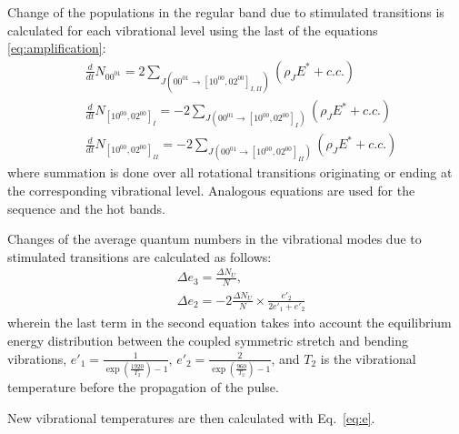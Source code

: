 \documentclass{report}
\begin{document}
Change of the populations in the regular band due to stimulated transitions is calculated for each vibrational level using the last of the equations \ref{eq:amplification}:
\begin{equation}\label{eq:dNdt}
\begin{aligned}
&\frac{d}{dt}N_{00^01} = 2\sum\limits_{J(00^01\rightarrow[10^00,02^00]_{I,II})} (\rho _J E^* + c.c.)\\
&\frac{d}{dt}N_{[10^00,02^00]_I} =  -2\sum\limits_{J(00^01\rightarrow[10^00,02^00]_I)} (\rho _J E^* + c.c.)\\
&\frac{d}{dt}N_{[10^00,02^00]_{II}} =  -2\sum\limits_{J(00^01\rightarrow[10^00,02^00]_{II})} (\rho _J E^* + c.c.)
\end{aligned}
\end{equation}
where summation is done over all rotational transitions originating or ending at the corresponding vibrational level. Analogous equations are used for the sequence and the hot bands.

Changes of the average quantum numbers in the vibrational modes due to stimulated transitions are calculated as follows:
\begin{equation}\label{eq:Deltae}
\begin{aligned}
&\Delta e_3 = \frac{\Delta N_U}{N},\\
&\Delta e_2 = -2\frac{\Delta N_U}{N} \times \frac{e'_2}{2e'_1+e'_2}
\end{aligned}
\end{equation}
wherein the last term in the second equation takes into account the equilibrium energy distribution between the coupled symmetric stretch and bending vibrations, $e'_1 = \frac{1}{\exp\left(\frac{1920}{T_2}\right)-1}$, $e'_2 = \frac{2}{\exp\left(\frac{960}{T_2}\right)-1}$, and $T_2$ is the vibrational temperature before the propagation of the pulse.

New vibrational temperatures are then calculated with Eq.~\ref{eq:e}.
\end{document}
